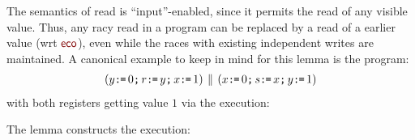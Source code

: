 The semantics of read is ``input''-enabled, since it permits the read of any visible value.   Thus, any racy read in a program can be replaced by a read of a earlier value (wrt $\reco$), even while  the races with existing independent writes are maintained.   A canonical example to keep in mind for this lemma is the program:
\begin{align*}
  (y\texttt{:}\mkern-1mu\texttt{=}\, 0 \texttt{;}\, r \texttt{:}\mkern-1mu\texttt{=}\, y  \texttt{;}\, x \texttt{:}\mkern-1mu\texttt{=}\, 1)
  \,\mathbin{\|}\,
  (x\texttt{:}\mkern-1mu\texttt{=}\, 0 \texttt{;}\, s \texttt{:}\mkern-1mu\texttt{=}\, x \texttt{;}\, y \texttt{:}\mkern-1mu\texttt{=}\, 1)
\end{align*}
with both registers getting value $1$ via the execution:
\begin{tikzdisplay}[node distance=1em]
\end{tikzdisplay}
The lemma constructs the execution:
\begin{tikzdisplay}[node distance=1em]
\end{tikzdisplay}


